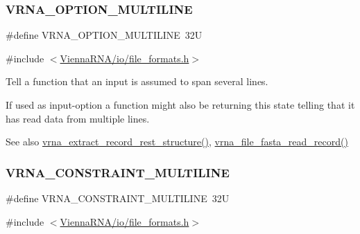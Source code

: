 \subsubsection{\texorpdfstring{V\+R\+N\+A\+\_\+\+O\+P\+T\+I\+O\+N\+\_\+\+M\+U\+L\+T\+I\+L\+I\+NE}{VRNA\_OPTION\_MULTILINE}}
{\footnotesize\ttfamily \#define V\+R\+N\+A\+\_\+\+O\+P\+T\+I\+O\+N\+\_\+\+M\+U\+L\+T\+I\+L\+I\+NE~32U}



{\ttfamily \#include $<$\hyperlink{io_2file__formats_8h}{Vienna\+R\+N\+A/io/file\+\_\+formats.\+h}$>$}



Tell a function that an input is assumed to span several lines. 

If used as input-\/option a function might also be returning this state telling that it has read data from multiple lines.

\begin{DoxySeeAlso}{See also}
\hyperlink{group__file__formats_gad37cbb63a05eed63ba25c91628409be0}{vrna\+\_\+extract\+\_\+record\+\_\+rest\+\_\+structure()}, \hyperlink{group__file__formats_ga8cfb7e271efc9e1f34640acb85475639}{vrna\+\_\+file\+\_\+fasta\+\_\+read\+\_\+record()} 
\end{DoxySeeAlso}
\mbox{\label{group__file__formats_ga7d725ef525b29891abef3f1ed42599a4}} 
\subsubsection{\texorpdfstring{V\+R\+N\+A\+\_\+\+C\+O\+N\+S\+T\+R\+A\+I\+N\+T\+\_\+\+M\+U\+L\+T\+I\+L\+I\+NE}{VRNA\_CONSTRAINT\_MULTILINE}}
{\footnotesize\ttfamily \#define V\+R\+N\+A\+\_\+\+C\+O\+N\+S\+T\+R\+A\+I\+N\+T\+\_\+\+M\+U\+L\+T\+I\+L\+I\+NE~32U}



{\ttfamily \#include $<$\hyperlink{io_2file__formats_8h}{Vienna\+R\+N\+A/io/file\+\_\+formats.\+h}$>$}



